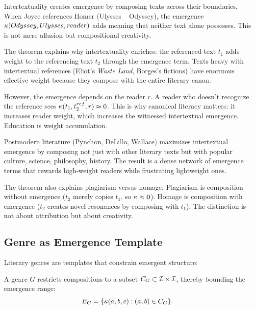 \begin{interpretation}
Intertextuality creates emergence by composing texts across their boundaries.
When Joyce references Homer (Ulysses ~ Odyssey), the emergence
$\kappa(Odyssey, Ulysses, reader)$ adds meaning that neither text alone possesses.
This is not mere allusion but compositional creativity.

The theorem explains why intertextuality enriches: the referenced text $t_1$
adds weight to the referencing text $t_2$ through the emergence term. Texts
heavy with intertextual references (Eliot's \emph{Waste Land}, Borges's fictions)
have enormous effective weight because they compose with the entire literary
canon.

However, the emergence depends on the reader $r$. A reader who doesn't recognize
the reference sees $\kappa(t_1, t_2^{ref}, r) \approx 0$. This is why canonical
literacy matters: it increases reader weight, which increases the witnessed
intertextual emergence. Education is weight accumulation.

Postmodern literature (Pynchon, DeLillo, Wallace) maximizes intertextual emergence
by composing not just with other literary texts but with popular culture, science,
philosophy, history. The result is a dense network of emergence terms that rewards
high-weight readers while frustrating lightweight ones.

The theorem also explains plagiarism versus homage. Plagiarism is composition
without emergence ($t_2$ merely copies $t_1$, so $\kappa \approx 0$). Homage
is composition with emergence ($t_2$ creates novel resonances by composing with
$t_1$). The distinction is not about attribution but about creativity.
\end{interpretation}

\subsection{Genre as Emergence Template}

Literary genres are templates that constrain emergent structure:

\begin{theorem}
\label{thm:genre-constraints}
A genre $G$ restricts compositions to a subset $C_G \subset \mathcal{I} \times \mathcal{I}$,
thereby bounding the emergence range:
\[
  E_G = \{\kappa(a,b,c) : (a,b) \in C_G\}.
\]
\end{theorem}

